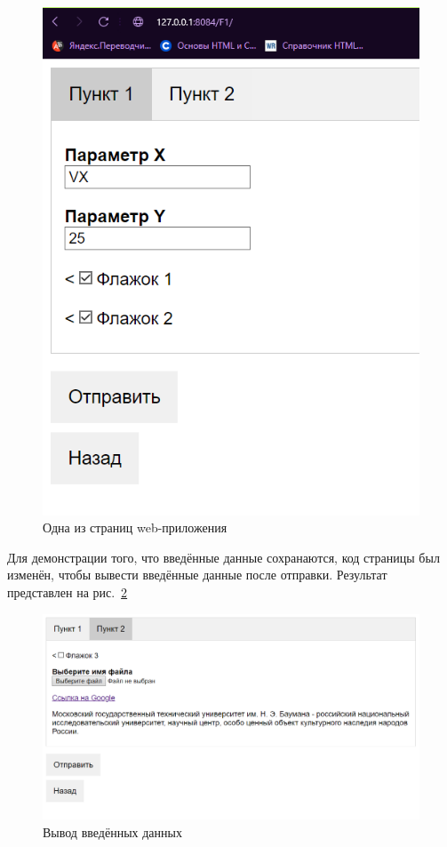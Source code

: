 \begin{figure}[!ht]
    \centering
    \includegraphics[scale=0.6]{ResearchNotes/rndhpc_dev_gui_2023_05_04/rndhpcgui.2023.05.04.picture3.png}
    \caption{Одна из страниц web-приложения}
    \label{rndhpcgui.2023.05.04.picture3}
\end{figure}

Для демонстрации того, что введённые данные сохранаются, код страницы был изменён, чтобы вывести введённые данные после отправки. Результат представлен на рис.~\ref{rndhpcgui.2023.05.04.picture4}

\begin{figure}[!ht]
    \centering
    \includegraphics[scale=0.5]{ResearchNotes/rndhpc_dev_gui_2023_05_04/rndhpcgui.2023.05.04.picture4.png}
    \caption{Вывод введённых данных}
    \label{rndhpcgui.2023.05.04.picture4}
\end{figure}
\noteattributes{}
